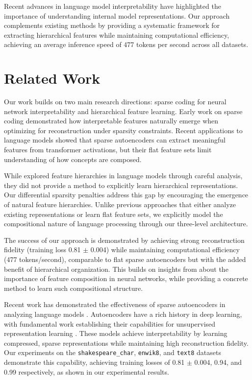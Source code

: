 Recent advances in language model interpretability have highlighted the importance of understanding internal model representations. Our approach complements existing methods by providing a systematic framework for extracting hierarchical features while maintaining computational efficiency, achieving an average inference speed of 477 tokens per second across all datasets.

\section{Related Work}

Our work builds on two main research directions: sparse coding for neural network interpretability and hierarchical feature learning. Early work on sparse coding \cite{Olshausen1996EmergenceOS} demonstrated how interpretable features naturally emerge when optimizing for reconstruction under sparsity constraints. Recent applications to language models \cite{anthropic2022decomposition} showed that sparse autoencoders can extract meaningful features from transformer activations, but their flat feature sets limit understanding of how concepts are composed.

While \cite{elhage2022solu} explored feature hierarchies in language models through careful analysis, they did not provide a method to explicitly learn hierarchical representations. Our differential sparsity penalties address this gap by encouraging the emergence of natural feature hierarchies. Unlike previous approaches that either analyze existing representations or learn flat feature sets, we explicitly model the compositional nature of language processing through our three-level architecture.

The success of our approach is demonstrated by achieving strong reconstruction fidelity (training loss 0.81 $\pm$ 0.004) while maintaining computational efficiency (477 tokens/second), comparable to flat sparse autoencoders but with the added benefit of hierarchical organization. This builds on insights from \cite{cammarata2020curve} about the importance of feature composition in neural networks, while providing a concrete method to learn such compositional structure.

Recent work has demonstrated the effectiveness of sparse autoencoders in analyzing language models \cite{anthropic2022decomposition}. Autoencoders have a rich history in deep learning, with fundamental work establishing their capabilities for unsupervised representation learning \cite{Kingma2013AutoEncodingVB}. These models achieve interpretability by learning compressed, sparse representations while maintaining high reconstruction fidelity. Our experiments on the \texttt{shakespeare\_char}, \texttt{enwik8}, and \texttt{text8} datasets demonstrate this capability, achieving training losses of 0.81 $\pm$ 0.004, 0.94, and 0.99 respectively, as shown in our experimental results.

